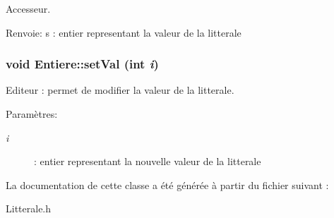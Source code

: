Accesseur. 

\begin{Desc}
\item[Renvoie:]s : entier representant la valeur de la litterale \end{Desc}
\hypertarget{class_entiere_c3dae32e641989e217776e93005ec570}{
\subsubsection[{setVal}]{\setlength{\rightskip}{0pt plus 5cm}void Entiere::setVal (int {\em i})}}
\label{class_entiere_c3dae32e641989e217776e93005ec570}


Editeur : permet de modifier la valeur de la litterale. 

\begin{Desc}
\item[Paramètres:]
\begin{description}
\item[{\em i}]: entier representant la nouvelle valeur de la litterale \end{description}
\end{Desc}


La documentation de cette classe a été générée à partir du fichier suivant :\begin{CompactItemize}
\item 
Litterale.h\end{CompactItemize}
